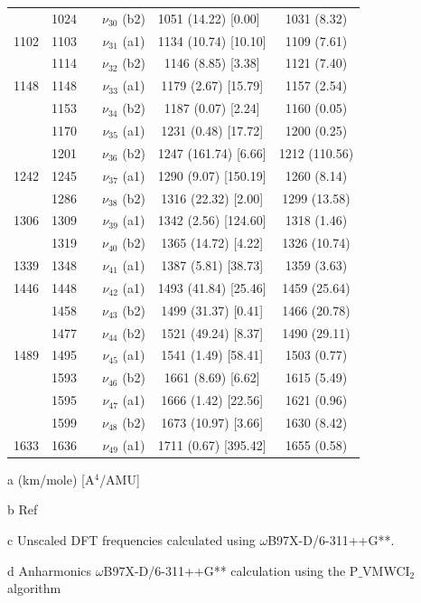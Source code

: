 \begin{table}[H]
\begin{center}
\begin{threeparttable}
\begin{tabular}{c c c c c c}
 & \multicolumn{1}{c}{1024} & \multicolumn{1}{c}{} & \multicolumn{1}{c}{ $\nu_{30}$ (b2)} & \multicolumn{1}{l}{1051 (14.22) [0.00]} & 1031 (8.32) \\ 
1102 & 1103 &  & $\nu_{31}$ (a1) & 1134 (10.74) [10.10] & 1109 (7.61) \\ 
& 1114 &  & $\nu_{32}$ (b2)
& 1146 (8.85) [3.38] & 1121 (7.40)\\ 
1148 & 1148 &  &$\nu_{33}$ (a1) & 1179 (2.67) [15.79] & 1157 (2.54) \\ 
& 1153 &  & $\nu_{34}$ (b2) & 1187 (0.07) [2.24] & 1160 (0.05) \\ 
& 1170 &  & $\nu_{35}$ (a1) & 1231 (0.48) [17.72] & 1200 (0.25) \\ 
& 1201 &  & $\nu_{36}$ (b2)& 1247 (161.74) [6.66] & 1212 (110.56)\\ 
1242 & 1245 &  & $\nu_{37}$ (a1) & 1290 (9.07) [150.19] & 1260 (8.14) \\ 
& 1286 &  & $\nu_{38}$ (b2) & 1316 (22.32) [2.00] & 1299 (13.58) \\ 
1306 & 1309 &  & $\nu_{39}$ (a1) &1342 (2.56) [124.60] & 1318 (1.46) \\ 
& 1319 &  & $\nu_{40}$ (b2) & 1365 (14.72) [4.22] & 1326 (10.74) \\ 
1339 & 1348 &  & $\nu_{41}$ (a1) & 1387 (5.81) [38.73] & 1359 (3.63) \\ 
1446 & 1448 &  & $\nu_{42}$ (a1) & 1493 (41.84) [25.46] & 1459 (25.64) \\
& 1458 &  & $\nu_{43}$  (b2) & 1499 (31.37) [0.41] & 1466 (20.78) \\ 
& 1477 &  & $\nu_{44}$ (b2) & 1521 (49.24) [8.37] & 1490 (29.11) \\ 
1489 & 1495 &  & $\nu_{45}$ (a1)& 1541 (1.49) [58.41] & 1503 (0.77)\\ 
& 1593 &  & $\nu_{46}$ (b2) & 1661 (8.69) [6.62] & 1615 (5.49) \\ 
& 1595 &  & $\nu_{47}$ (a1) & 1666 (1.42) [22.56] & 1621 (0.96) \\
& 1599 &  & $\nu_{48}$ (b2) & 1673 (10.97) [3.66] & 1630 (8.42) \\ 
1633 & 1636 &  & $\nu_{49}$ (a1) & 1711 (0.67) [395.42] & 1655 (0.58) \\
		\bottomrule		
	\end{tabular}
	
	\begin{tablenotes}
		\item[a] (km/mole) [A$^{4}$/AMU]
		\item[b] Ref \cite{klots1996vibrational}
		\item[c] Unscaled DFT frequencies calculated using $\omega$B97X-D/6-311++G**.
		\item[d] Anharmonics $\omega$B97X-D/6-311++G** calculation using the P$\_$VMWCI$_{2}$ algorithm
	\end{tablenotes}
\end{threeparttable}
\end{center}
\label{freq-Dibenzofuran}
\end{table}
	
